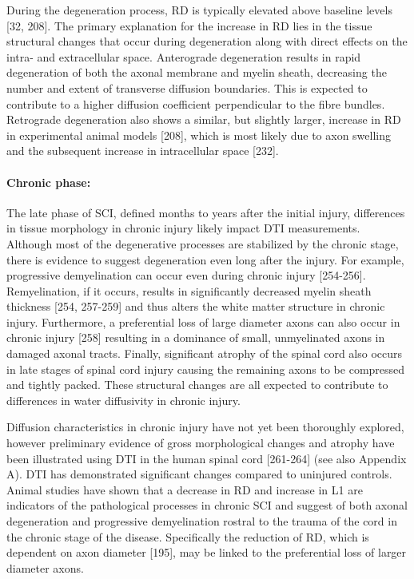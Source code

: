 During the degeneration process, \gls{RD} is typically elevated above baseline levels [32, 208].  The primary explanation for the increase in \gls{RD} lies in the tissue structural changes that occur during degeneration along with direct effects on the intra- and extracellular space.  Anterograde degeneration results in rapid degeneration of both the axonal membrane and myelin sheath, decreasing the number and extent of transverse diffusion boundaries.  This is expected to contribute to a higher diffusion coefficient perpendicular to the fibre bundles.  Retrograde degeneration also shows a similar, but slightly larger, increase in \gls{RD} in experimental animal models [208], which is most likely due to axon swelling and the subsequent increase in intracellular space [232]. 
%
%
\paragraph{Chronic phase: } The late phase of SCI, defined months to years after the initial injury, differences in tissue morphology in chronic injury likely impact DTI measurements.  Although most of the degenerative processes are stabilized by the chronic stage, there is evidence to suggest degeneration even long after the injury.  For example, progressive demyelination can occur even during chronic injury [254-256].  Remyelination, if it occurs, results in significantly decreased myelin sheath thickness [254, 257-259] and thus alters the white matter structure in chronic injury.  Furthermore, a preferential loss of large diameter axons can also occur in chronic injury [258] resulting in a dominance of small, unmyelinated axons in damaged axonal tracts.  Finally, significant atrophy of the spinal cord also occurs in late stages of spinal cord injury causing the remaining axons to be compressed and tightly packed. These structural changes are all expected to contribute to differences in water diffusivity in chronic injury.



Diffusion characteristics in chronic injury have not  yet been thoroughly explored, however preliminary evidence of gross morphological changes and atrophy have been illustrated using \gls{DTI} in the human spinal cord [261-264] (see also Appendix A).  \Gls{DTI} has demonstrated significant changes compared to uninjured controls. Animal studies have shown that a decrease in \gls{RD} and increase in \gls{L1} are indicators of the pathological processes in chronic \gls{SCI} \citet{Budde:2008,Feng:2009,Kim:2006,Kim:2009,Song:2002, Zhang:2009} and suggest of both axonal degeneration and progressive demyelination rostral to the trauma of the cord in the chronic stage of the disease. Specifically the reduction of \gls{RD}, which is dependent on axon diameter [195], may be linked to the preferential loss of larger diameter axons.  

